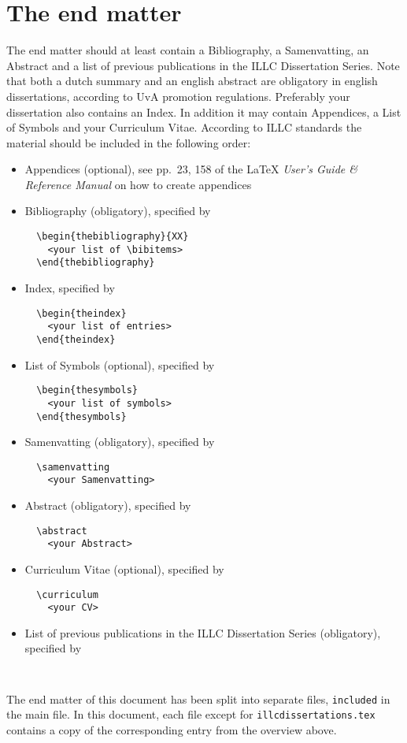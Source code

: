 \section{The end matter}
The end matter should at least contain a Bibliography, a Samenvatting,
an Abstract
and a list of previous publications in the ILLC Dissertation Series.
Note that both a dutch summary and an english abstract are obligatory
in english dissertations, according to UvA promotion regulations.
Preferably your dissertation also contains an Index.
In addition it may contain
Appendices, a List of Symbols and your Curriculum Vitae. According to ILLC
standards the material should be included in the following order:
\begin{itemize}
\item
Appendices (optional), see pp.\ 23, 158 of the
  \LaTeX{} {\em User's Guide \& Reference Manual\/} on how to create
  appendices 
\item
Bibliography (obligatory), specified by 
\begin{verbatim}
  \begin{thebibliography}{XX}
    <your list of \bibitems>
  \end{thebibliography}
\end{verbatim}
\item
Index, specified by
\begin{verbatim}
  \begin{theindex}
    <your list of entries>
  \end{theindex}
\end{verbatim}
\item
List of Symbols (optional), specified by
\begin{verbatim}
  \begin{thesymbols}
    <your list of symbols>
  \end{thesymbols}
\end{verbatim}
\item
Samenvatting (obligatory), specified by
\begin{verbatim}
  \samenvatting
    <your Samenvatting>
\end{verbatim}
\item
Abstract (obligatory), specified by
\begin{verbatim}
  \abstract
    <your Abstract>
\end{verbatim}

\item
Curriculum Vitae (optional), specified by
\begin{verbatim}
  \curriculum
    <your CV>
\end{verbatim}
\item
List of previous publications in the ILLC Dissertation Series (obligatory), 
specified by
\begin{verbatim}
  
\end{verbatim}
\end{itemize}
The end matter of this document has been split into separate files,
\verb|included| in the main file.
In this document, each file except for {\tt illcdissertations.tex} 
contains a copy of the corresponding entry from the overview above.

